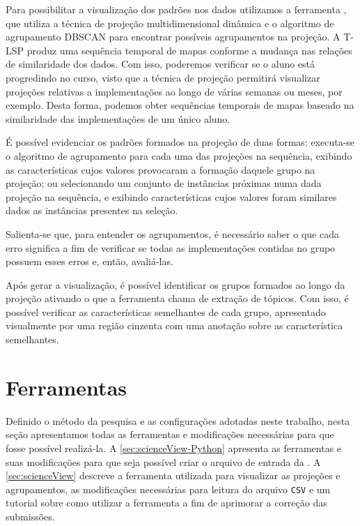 			Para possibilitar a visualização dos padrões nos dados utilizamos a
			ferramenta  \cite{Alencar-etal:2012}, que utiliza a
			técnica de projeção multidimensional dinâmica \cite{Alencar} e o algoritmo
			de agrupamento \acs{DBSCAN} \cite{Ester1996} para encontrar possíveis
			agrupamentos na projeção. A \acs{T-LSP} \cite{Alencar}
			produz uma sequência temporal de mapas conforme a mudança nas relações de
			similaridade dos dados. Com isso, poderemos verificar se o aluno está
			progredindo no curso, visto que a técnica de projeção permitirá visualizar
			projeções relativas a implementações ao longo de várias semanas ou meses,
			por exemplo. Desta forma, podemos obter sequências temporais de mapas
			baseado na similaridade das implementações de um único aluno.
			
			É possível evidenciar os padrões formados na projeção de duas formas:
			executa-se o algoritmo de agrupamento para cada uma das projeções na
			sequência, exibindo as características cujos valores provocaram a formação
			daquele grupo na projeção; ou selecionando um conjunto de instâncias próximas
			numa dada projeção na sequência, e exibindo características cujos valores
			foram similares dados as instâncias presentes na seleção.
			
			Salienta-se que, para entender os agrupamentos, é necessário saber o que cada
			erro significa a fim de verificar se todas as implementações contidas no grupo
			possuem esses erros e, então, avaliá-las.
			
			Após gerar a visualização, é possível identificar os grupos formados ao longo da
			projeção ativando o que a ferramenta chama de extração de tópicos. Com isso, é
			possível verificar as características semelhantes de cada grupo, apresentado
			visualmente por uma região cinzenta com uma anotação sobre as característica
			semelhantes.
			
		
	\section{Ferramentas}

		Definido o método da pesquisa e as configurações adotadas neste trabalho, nesta seção apresentamos todas as ferramentas
		e modificações necessárias para que fosse possível realizá-la. A \cref{sec:scienceView-Python}
		apresenta as ferramentas e suas modificações para que seja possível criar
		o arquivo de entrada da . A \cref{sec:scienceView} descreve a
		ferramenta utilizada para visualizar as projeções e agrupamentos, as
		modificações necessárias para leitura do arquivo \texttt{CSV} e um tutorial
		sobre como utilizar a ferramenta a fim de aprimorar a correção das submissões.
		

